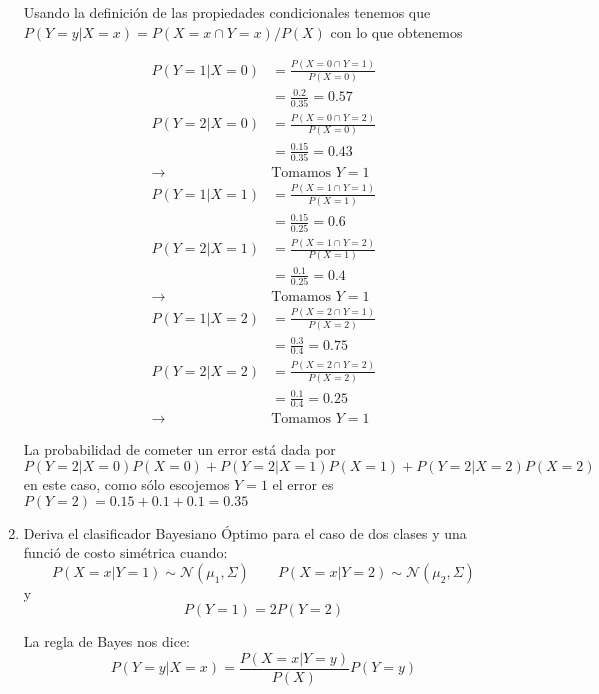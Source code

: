 \documentclass{article}
\begin{document}
\begin{enumerate}
Usando la definición de las propiedades condicionales tenemos que $P(Y = y | X = x) = P(X = x \cap Y = x) / P(X)$ con lo que obtenemos
\vspace{-4ex}
\begin{multicols}{3}
\small
  \begin{align*}
    P(Y = 1 | X = 0) &= \frac{P( X = 0 \cap Y = 1)}{P(X = 0)}\\
                     &= \frac{0.2}{0.35} = 0.57\\
    P(Y = 2 | X = 0) &= \frac{P( X = 0 \cap Y = 2)}{P(X = 0)}\\
                     &= \frac{0.15}{0.35} = 0.43\\
         \rightarrow & \text{Tomamos } Y = 1
  \end{align*}\break
  \begin{align*}
    P(Y = 1 | X = 1) &= \frac{P( X = 1 \cap Y = 1)}{P(X = 1)}\\
                     &= \frac{0.15}{0.25} = 0.6\\
    P(Y = 2 | X = 1) &= \frac{P( X = 1 \cap Y = 2)}{P(X = 1)}\\
                     &= \frac{0.1}{0.25} = 0.4\\
         \rightarrow & \text{Tomamos } Y = 1
  \end{align*}\break
  \begin{align*}
    P(Y = 1 | X = 2) &= \frac{P( X = 2 \cap Y = 1)}{P(X = 2)}\\
                     &= \frac{0.3}{0.4} = 0.75\\
    P(Y = 2 | X = 2) &= \frac{P( X = 2 \cap Y = 2)}{P(X = 2)}\\
                     &= \frac{0.1}{0.4} = 0.25\\
         \rightarrow & \text{Tomamos } Y = 1
  \end{align*}
\end{multicols}

La probabilidad de cometer un error está dada por
$$P(Y = 2 | X = 0)P(X = 0) + P(Y = 2 | X = 1)P(X = 1) + P(Y = 2 | X = 2)P(X = 2)$$
en este caso, como sólo escojemos $Y = 1$ el error es $P(Y = 2) = 0.15 + 0.1 + 0.1 = 0.35$

\item Deriva el clasificador Bayesiano Óptimo para el caso de dos clases y una funció de costo simétrica cuando:
  $$ P(X = x|Y = 1) \sim \mathcal{N}(\mu_1, \Sigma) \qquad P(X = x|Y = 2) \sim \mathcal{N}(\mu_2, \Sigma) $$
y
  $$ P(Y = 1) = 2 P(Y = 2)$$

La regla de Bayes nos dice:
  $$P(Y = y | X = x) = \frac{P(X = x | Y = y)}{P(X)}P(Y = y)$$


\end{enumerate}
\end{document}
